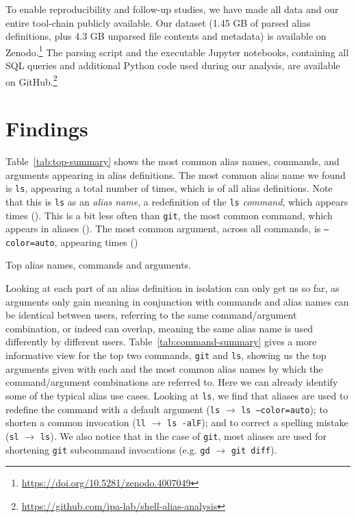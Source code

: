 \documentclass[smallextended,natbib]{svjour3}
\newcommand{\num}[1]{\numprint{#1}}
\newcommand{\per}[1]{\numprint[\%]{#1}}
\newcommand{\alias}[2]{{\texttt{#1} $\rightarrow$ \texttt{#2}}}
\begin{document}
To enable reproducibility and follow-up studies, we have made all data and our entire tool-chain publicly available.
Our dataset (1.45 GB of parsed alias definitions, plus 4.3 GB unparsed file contents and metadata) is available on Zenodo.\footnote{\url{https://doi.org/10.5281/zenodo.4007049}}
The parsing script and the executable Jupyter notebooks, containing all SQL queries and additional Python code used during our analysis, are available on GitHub.\footnote{\url{https://github.com/ipa-lab/shell-alias-analysis}}

\section{Findings}

Table~\ref{tab:top-summary} shows the most common alias names, commands, and arguments appearing in alias definitions.
The most common alias name we found is \texttt{ls}, appearing a total number of \num{83782} times, which is \per{3.8} of all alias definitions.
Note that this is \texttt{ls} as an \emph{alias name}, a redefinition of the \texttt{ls} \emph{command}, which appears \num{260156} times (\per{10.27}).
This is a bit less often than \texttt{git}, the most common command, which appears in \num{327786} aliases (\per{12.93}).
The most common argument, across all commands, is \texttt{--color=auto}, appearing \num{153931} times (\per{4.24})

\begin{table}
    \centering
    \caption{Top alias names, commands and arguments.}
    \label{tab:top-summary}
    
\end{table}

Looking at each part of an alias definition in isolation can only get us so far, as arguments only gain meaning in conjunction with commands and alias names can be identical between users, referring to the same command/argument combination, or indeed can overlap, meaning the same alias name is used differently by different users.
Table~\ref{tab:command-summary} gives a more informative view for the top two commands, \texttt{git} and \texttt{ls}, showing us the top arguments given with each and the most common alias names by which the command/argument combinations are referred to.
Here we can already identify some of the typical alias use cases.
Looking at \texttt{ls}, we find that aliases are used
to redefine the command with a default argument (\alias{ls}{ls --color=auto});
to shorten a common invocation (\alias{ll}{ls -alF});
and to correct a spelling mistake (\alias{sl}{ls}).
We also notice that in the case of \texttt{git}, most aliases are used for shortening \texttt{git} subcommand invocations (e.g. \alias{gd}{git diff}).
\end{document}
